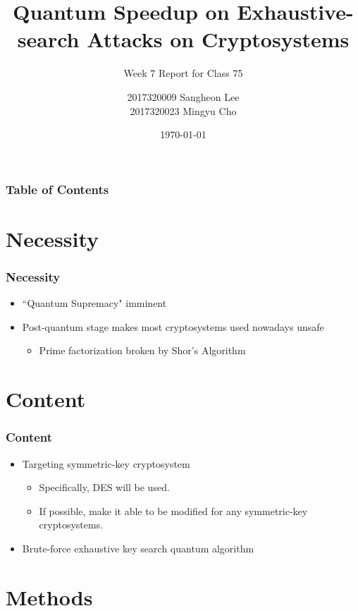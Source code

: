 \documentclass{beamer}
\title{Quantum Speedup on Exhaustive-search Attacks on Cryptosystems}
\subtitle{Week 7 Report for Class 75}
\author{2017320009 Sangheon Lee\\ 2017320023 Mingyu Cho}
\date{\today}
\newif\ifproposal
\begin{document}
    \begin{frame}
        \titlepage
    \end{frame}

    \begin{frame}
        \frametitle{Table of Contents}
        \tableofcontents
    \end{frame}

    \ifproposal
    \section{Necessity}

    \begin{frame}
        \frametitle{Necessity}

        \begin{itemize}
            \item ``Quantum Supremacy" imminent
            \item Post-quantum stage makes most cryptosystems used nowadays unsafe
            \begin{itemize}
                \item Prime factorization broken by Shor's Algorithm
            \end{itemize}
        \end{itemize}
    \end{frame}

    \section{Content}

    \begin{frame}
        \frametitle{Content}

        \begin{itemize}
            \item Targeting symmetric-key cryptosystem
            \begin{itemize}
                \item Specifically, DES will be used.
                \item If possible, make it able to be modified for any symmetric-key cryptosystems.
            \end{itemize}
            \item Brute-force exhaustive key search quantum algorithm
        \end{itemize}
    \end{frame}

    \section{Methods}
\end{document}
